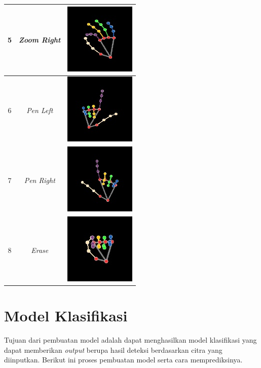 \begin{longtable}{|c|c|c|}
  \hline
  5 & \emph{Zoom Right}  &  \includegraphics[scale=0.85]{gambar/pose_prediction_zoom_right.jpg} \\
  \hline
  6 & \emph{Pen Left}  &  \includegraphics[scale=0.85]{gambar/pose_prediction_pen_left.jpg} \\
  \hline
  7 & \emph{Pen Right}  &  \includegraphics[scale=0.85]{gambar/pose_prediction_pen_right.jpg} \\
  \hline
  8 & \emph{Erase}  &  \includegraphics[scale=0.85]{gambar/pose_prediction_erase.jpg} \\
  \hline
\end{longtable}

\section{Model Klasifikasi}
\label{sec:modelklasifikasi}

Tujuan dari pembuatan model adalah dapat menghasilkan model klasifikasi yang dapat memberikan \emph{output} berupa hasil deteksi berdasarkan citra yang diinputkan. Berikut ini proses pembuatan model serta cara memprediksinya. 

